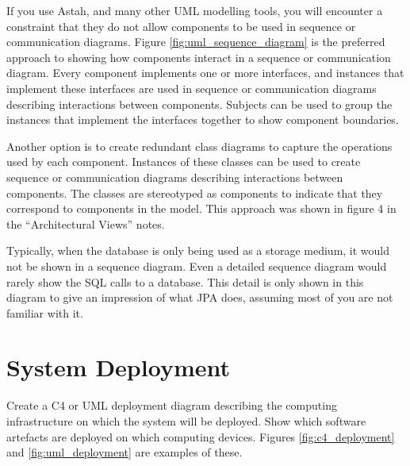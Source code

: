 \documentclass{csse4400}
\begin{document}
\noindent
If you use Astah, and many other UML modelling tools, you will encounter a constraint that they do not allow components to be used in sequence or communication diagrams.
Figure \ref{fig:uml_sequence_diagram} is the preferred approach to showing how components interact in a sequence or communication diagram.
Every component implements one or more interfaces, and instances that implement these interfaces are used in sequence or communication diagrams describing interactions between components.
Subjects can be used to group the instances that implement the interfaces together to show component boundaries.

Another option is to create redundant class diagrams to capture the operations used by each component.
Instances of these classes can be used to create sequence or communication diagrams describing interactions between components.
The classes are stereotyped as components to indicate that they correspond to components in the model.
This approach was shown in figure 4 in the ``Architectural Views'' notes.

Typically, when the database is only being used as a storage medium, it would not be shown in a sequence diagram.
Even a detailed sequence diagram would rarely show the SQL calls to a database.
This detail is only shown in this diagram to give an impression of what JPA does, assuming most of you are not familiar with it.



\newpage
\section{System Deployment}
Create a C4 or UML deployment diagram describing the computing infrastructure on which the system will be deployed.
Show which software artefacts are deployed on which computing devices.
Figures \ref{fig:c4_deployment} and \ref{fig:uml_deployment} are examples of these.
\end{document}
